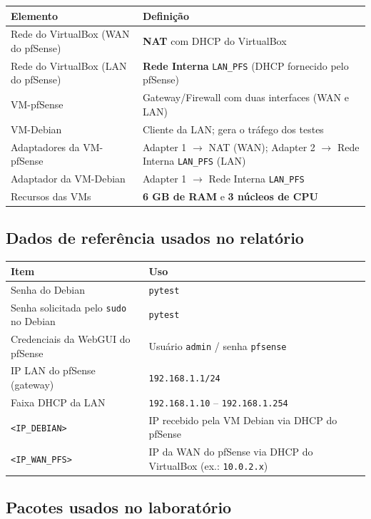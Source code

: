 \begin{tabularx}{\linewidth}{lX}
\toprule
\textbf{Elemento} & \textbf{Definição} \\
\midrule
Rede do VirtualBox (WAN do pfSense) & \textbf{NAT} com DHCP do VirtualBox \\
Rede do VirtualBox (LAN do pfSense) & \textbf{Rede Interna} \texttt{LAN\_PFS} (DHCP fornecido pelo pfSense) \\
VM-pfSense & Gateway/Firewall com duas interfaces (WAN e LAN) \\
VM-Debian & Cliente da LAN; gera o tráfego dos testes \\
Adaptadores da VM-pfSense & Adapter 1 $\rightarrow$ NAT (WAN); Adapter 2 $\rightarrow$ Rede Interna \texttt{LAN\_PFS} (LAN) \\
Adaptador da VM-Debian & Adapter 1 $\rightarrow$ Rede Interna \texttt{LAN\_PFS} \\
Recursos das VMs & \textbf{6 GB de RAM} e \textbf{3 núcleos de CPU} \\
\bottomrule
\end{tabularx}

\subsection{Dados de referência usados no relatório}

\begin{tabularx}{\linewidth}{lX}
\toprule
\textbf{Item} & \textbf{Uso} \\
\midrule
Senha do Debian & \texttt{pytest} \\
Senha solicitada pelo \texttt{sudo} no Debian & \texttt{pytest} \\
Credenciais da WebGUI do pfSense & Usuário \texttt{admin} / senha \texttt{pfsense} \\
IP LAN do pfSense (gateway) & \texttt{192.168.1.1/24} \\
Faixa DHCP da LAN & \texttt{192.168.1.10} -- \texttt{192.168.1.254} \\
\texttt{<IP\_DEBIAN>} & IP recebido pela VM Debian via DHCP do pfSense \\
\texttt{<IP\_WAN\_PFS>} & IP da WAN do pfSense via DHCP do VirtualBox (ex.: \texttt{10.0.2.x}) \\
\bottomrule
\end{tabularx}

\subsection{Pacotes usados no laboratório}

